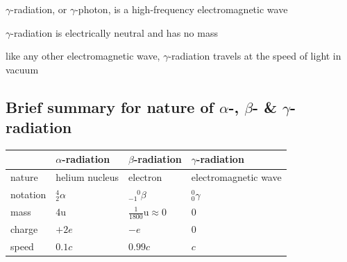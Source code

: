 \documentclass[a4paper,12pt]{book}
\newcounter{question}[chapter]
\begin{document}
$\gamma$-radiation, or $\gamma$-photon, is a high-frequency electromagnetic wave

$\gamma$-radiation is electrically neutral and has no mass

like any other electromagnetic wave, $\gamma$-radiation travels at the speed of light in vacuum

\subsection*{Brief summary for nature of \texorpdfstring{$\alpha$}{\textalpha}-, \texorpdfstring{$\beta$}{\textbeta}- \& \texorpdfstring{$\gamma$}{\textgamma}-radiation}

\begin{center}
	{\renewcommand{\arraystretch}{1.2}
	\begin{tabular}{|C{2cm}|C{2.8cm}|C{2.8cm}|C{4.2cm}|}
	\hline  & $\alpha$-radiation & $\beta$-radiation & $\gamma$-radiation \\ 
	\hline nature & helium nucleus & electron & electromagnetic wave \\ 
	\hline notation & $^4_2\alpha$ & $^{\phantom{-}0}_{-1}\beta$ & $^0_0\gamma$ \\
	\hline mass & 4u & $\frac{1}{1800}\text{u} \approx 0$ & 0 \\[4pt]
	\hline charge & $+2e$ & $-e$ & 0 \\ 
	\hline speed & $0.1c$ & $0.99c$ & $c$ \\
	\hline
    \end{tabular}
    }
\end{center}



\begin{figure}[ht]
	\centering
\end{figure}
\end{document}

